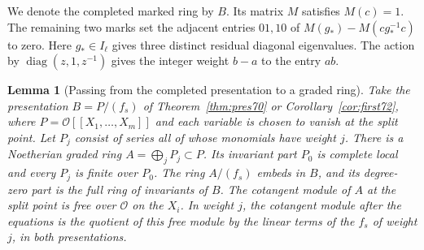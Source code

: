 \documentclass[a4paper,11pt]{article}
\newtheorem{lemma}[proposition]{Lemma}
\theoremstyle{definition}
\theoremstyle{remark}
\numberwithin{equation}{section}
\newcommand{\OO}{\mathcal O}
\begin{document}
We denote the completed marked ring by \(B\). Its matrix \(M\)
satisfies \(M(c)=1\). The remaining two marks set the adjacent
entries \(01,10\) of \(M(g_*)-M(cg_*^{-1}c)\) to zero.
Here \(g_*\in I_\ell\) gives three distinct residual diagonal
eigenvalues. The action by \(\operatorname{diag}(z,1,z^{-1})\)
gives the integer weight \(b-a\) to the entry \(ab\).

\begin{lemma}[Passing from the completed presentation to a graded ring]
\label{lem:algebra116}
Take the presentation \(B=P/(f_s)\) of Theorem~\ref{thm:pres70}
or Corollary~\ref{cor:first72}, where \(P=\OO[[X_1,\ldots,X_m]]\)
and each variable is chosen to vanish at the split point. Let
\(P_j\) consist of series all of whose monomials have weight \(j\).
There is a Noetherian graded ring \(A=\bigoplus_j P_j\subset P\).
Its invariant part \(P_0\) is complete local and every \(P_j\)
is finite over \(P_0\). The ring \(A/(f_s)\) embeds in \(B\),
and its degree-zero part is the full ring of invariants of \(B\).
The cotangent module of \(A\) at the split point is free over
\(\OO\) on the \(X_i\). In weight \(j\), the cotangent module
after the equations is the quotient of this free module by the
linear terms of the \(f_s\) of weight \(j\), in both presentations.
\end{lemma}
\end{document}
